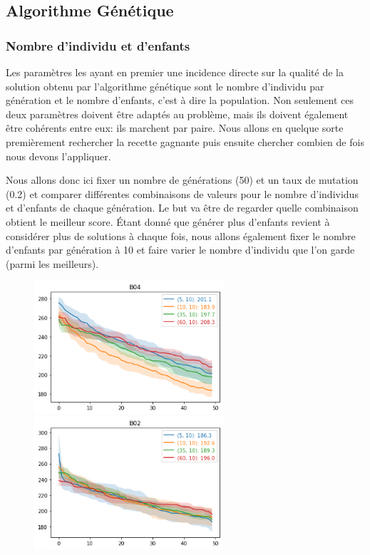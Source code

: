 \documentclass{article}
\begin{document}
\subsection{Algorithme Génétique}

\subsubsection{Nombre d'individu et d'enfants}
Les paramètres les ayant en premier une incidence directe sur la qualité de la solution obtenu par l'algorithme génétique sont le nombre d'individu par génération et le nombre d'enfants, c'est à dire la population. Non seulement ces deux paramètres doivent être adaptés au problème, mais ils doivent également être cohérents entre eux: ils marchent par paire. Nous allons en quelque sorte premièrement rechercher la recette gagnante puis ensuite chercher combien de fois nous devons l'appliquer. \\ \par

Nous allons donc ici fixer un nombre de générations (50) et un taux de mutation (0.2) et comparer différentes combinaisons de valeurs pour le nombre d'individus et d'enfants de chaque génération. Le but va être de regarder quelle combinaison obtient le meilleur score. Étant donné que générer plus d'enfants revient à considérer plus de solutions à chaque fois, nous allons également fixer le nombre d'enfants par génération à 10 et faire varier le nombre d'individu que l'on garde (parmi les meilleurs). 

\begin{figure}[H]
	\centerline{ \includegraphics[width=7cm]{images/B04pop.png} \includegraphics[width=7cm]{images/B02pop.png} } 
\end{figure}
\end{document}
